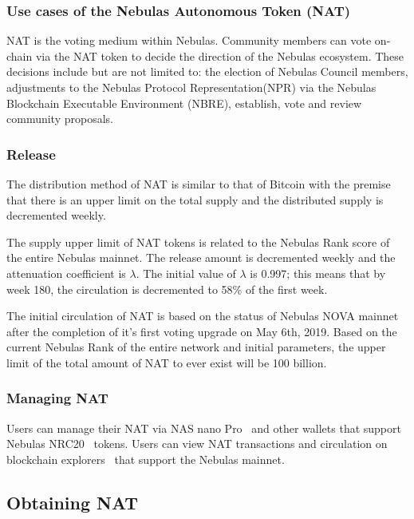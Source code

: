 \subsubsection{Use cases of the Nebulas Autonomous Token (NAT)}


NAT is the voting medium within Nebulas. Community members can vote on-chain via the NAT token to decide the direction of the Nebulas ecosystem. These decisions include but are not limited to: the election of Nebulas Council members, adjustments to the Nebulas Protocol Representation(NPR) via the Nebulas Blockchain Executable Environment (NBRE), establish, vote and review community proposals.

\subsubsection{Release}

The distribution method of NAT is similar to that of Bitcoin with the premise that there is an upper limit on the total supply and the distributed supply is decremented weekly.

The supply upper limit of NAT tokens is related to the Nebulas Rank score of
the entire Nebulas mainnet. The release amount is decremented weekly and the
attenuation coefficient is $\lambda$. The initial value of $\lambda$ is 0.997; this means that by week 180, the circulation is decremented to 58\% of the first week.

The initial circulation of NAT is based on the status of Nebulas NOVA mainnet after the completion of it's first voting upgrade on May 6th, 2019. Based on the current Nebulas Rank of the entire network and initial parameters, the upper limit of the total amount of NAT to ever exist will be 100 billion.

\subsubsection{Managing NAT}

Users can manage their NAT via NAS nano Pro~\cite{NASnano} and other wallets that support Nebulas NRC20~\cite{wallets} tokens. Users can view NAT transactions and circulation on blockchain explorers~\cite{explorer} that support the Nebulas mainnet.

\subsection{Obtaining NAT}

